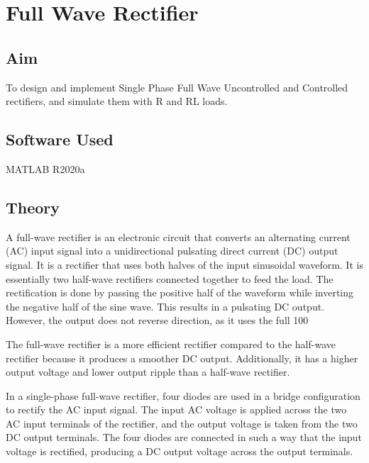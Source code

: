 \chapter{Full Wave Rectifier}
\vspace{-1cm}

\section{Aim}
\hspace{1cm}To design and implement Single Phase Full Wave Uncontrolled and Controlled rectifiers, and
simulate them with R and RL loads.

\section{Software Used}
\hspace{1cm}MATLAB R2020a
\section{Theory}
\hspace{\parindent}

A full-wave rectifier is an electronic circuit that converts an alternating current (AC) input signal into a unidirectional pulsating direct current (DC) output signal. It is a rectifier that uses both halves of the input sinusoidal waveform. It is essentially two half-wave rectifiers connected together to feed the load. The rectification is done by passing the positive half of the waveform while inverting the negative half of the sine wave. This results in a pulsating DC output. However, the output does not reverse direction, as it uses the full 100%

The full-wave rectifier is a more efficient rectifier compared to the half-wave rectifier because it produces a smoother DC output. Additionally, it has a higher output voltage and lower output ripple than a half-wave rectifier.

In a single-phase full-wave rectifier, four diodes are used in a bridge configuration to rectify the AC input signal. The input AC voltage is applied across the two AC input terminals of the rectifier, and the output voltage is taken from the two DC output terminals. The four diodes are connected in such a way that the input voltage is rectified, producing a DC output voltage across the output terminals.

